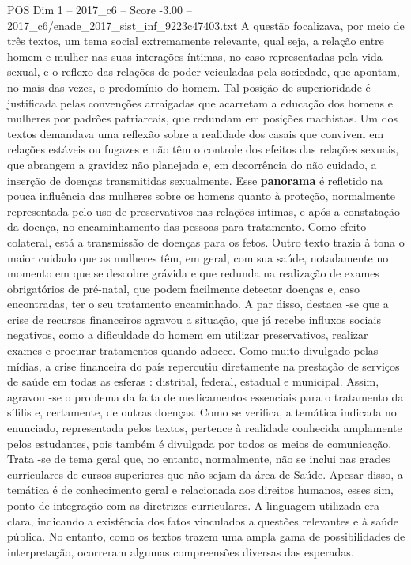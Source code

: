 \begin{textsample}{POS Dim 1 – 2017\_c6 – Score -3.00 – 2017\_c6/enade\_2017\_sist\_inf\_9223c47403.txt}
A questão focalizava, por meio de três textos, um tema social extremamente relevante, qual seja, a relação entre homem e mulher nas suas interações íntimas, no caso representadas pela vida sexual, e o reflexo das relações de poder veiculadas pela sociedade, que apontam, no mais das vezes, o predomínio do homem.
Tal posição de superioridade é justificada pelas convenções arraigadas que acarretam a educação dos homens e mulheres por padrões patriarcais, que redundam em posições machistas.
Um dos textos demandava uma reflexão sobre a realidade dos casais que convivem em relações estáveis ou fugazes e não têm o controle dos efeitos das relações sexuais, que abrangem a gravidez não planejada e, em decorrência do não cuidado, a inserção de doenças transmitidas sexualmente.
Esse \textbf{panorama} é refletido na pouca influência das mulheres sobre os homens quanto à proteção, normalmente representada pelo uso de preservativos nas relações intimas, e após a constatação da doença, no encaminhamento das pessoas para tratamento.
Como efeito colateral, está a transmissão de doenças para os fetos.
Outro texto trazia à tona o maior cuidado que as mulheres têm, em geral, com sua saúde, notadamente no momento em que se descobre grávida e que redunda na realização de exames obrigatórios de pré-natal, que podem facilmente detectar doenças e, caso encontradas, ter o seu tratamento encaminhado.
A par disso, destaca -se que a crise de recursos financeiros agravou a situação, que já recebe influxos sociais negativos, como a dificuldade do homem em utilizar preservativos, realizar exames e procurar tratamentos quando adoece.
Como muito divulgado pelas mídias, a crise financeira do país repercutiu diretamente na prestação de serviços de saúde em todas as esferas : distrital, federal, estadual e municipal.
Assim, agravou -se o problema da falta de medicamentos essenciais para o tratamento da sífilis e, certamente, de outras doenças.
Como se verifica, a temática indicada no enunciado, representada pelos textos, pertence à realidade conhecida amplamente pelos estudantes, pois também é divulgada por todos os meios de comunicação.
Trata -se de tema geral que, no entanto, normalmente, não se inclui nas grades curriculares de cursos superiores que não sejam da área de Saúde.
Apesar disso, a temática é de conhecimento geral e relacionada aos direitos humanos, esses sim, ponto de integração com as diretrizes curriculares.
A linguagem utilizada era clara, indicando a existência dos fatos vinculados a questões relevantes e à saúde pública.
No entanto, como os textos trazem uma ampla gama de possibilidades de interpretação, ocorreram algumas compreensões diversas das esperadas.

\end{textsample}
